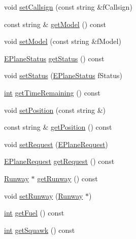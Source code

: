 \begin{DoxyCompactItemize}
\item 
void \hyperlink{classAirplane_a2b9b2ea3c51f0d1be91e1ffb7543f03d}{set\+Callsign} (const string \&f\+Callsign)
\item 
const string \& \hyperlink{classAirplane_ab3086ab630a7e427df70c7b45f11dd82}{get\+Model} () const 
\item 
void \hyperlink{classAirplane_a79639d54a99b5d1fc33c8e97ee091fe8}{set\+Model} (const string \&f\+Model)
\item 
\hyperlink{Airplane_8h_a0e5bbf7c6c727baaba49062300fae19f}{E\+Plane\+Status} \hyperlink{classAirplane_a40bbb3024a476115700977c60bae2705}{get\+Status} () const 
\item 
void \hyperlink{classAirplane_a23934fb97d8fab12d4dc790cee673747}{set\+Status} (\hyperlink{Airplane_8h_a0e5bbf7c6c727baaba49062300fae19f}{E\+Plane\+Status} f\+Status)
\item 
\hyperlink{CMakeCache_8txt_a79a3d8790b2588b09777910863574e09}{int} \hyperlink{classAirplane_a39233c86a764ac1051ce4b4460a9a684}{get\+Time\+Remaining} () const 
\item 
void \hyperlink{classAirplane_a656e916c30af73584f781e7e2e28e78a}{set\+Position} (const string \&)
\item 
const string \& \hyperlink{classAirplane_ab4fa66c0adb05725a51524265f8c520c}{get\+Position} () const 
\item 
void \hyperlink{classAirplane_affcc5325670824881ccc1524223aa209}{set\+Request} (\hyperlink{Airplane_8h_a4a8a3f45932bdf601f093bea061bad9b}{E\+Plane\+Request})
\item 
\hyperlink{Airplane_8h_a4a8a3f45932bdf601f093bea061bad9b}{E\+Plane\+Request} \hyperlink{classAirplane_afe210aea9002a8975234a78350158c46}{get\+Request} () const 
\item 
\hyperlink{classRunway}{Runway} $\ast$ \hyperlink{classAirplane_ab6dda72f7cfd29a7334e0494d184bbfa}{get\+Runway} () const 
\item 
void \hyperlink{classAirplane_a81fe42b8f9310edae12abb6e5f3ae9ac}{set\+Runway} (\hyperlink{classRunway}{Runway} $\ast$)
\item 
\hyperlink{CMakeCache_8txt_a79a3d8790b2588b09777910863574e09}{int} \hyperlink{classAirplane_a23170e5f55fa9fc6822be06615f028db}{get\+Fuel} () const 
\item 
\hyperlink{CMakeCache_8txt_a79a3d8790b2588b09777910863574e09}{int} \hyperlink{classAirplane_a88f0199d7eae4d1f24b14802047549ea}{get\+Squawk} () const 
\end{DoxyCompactItemize}


